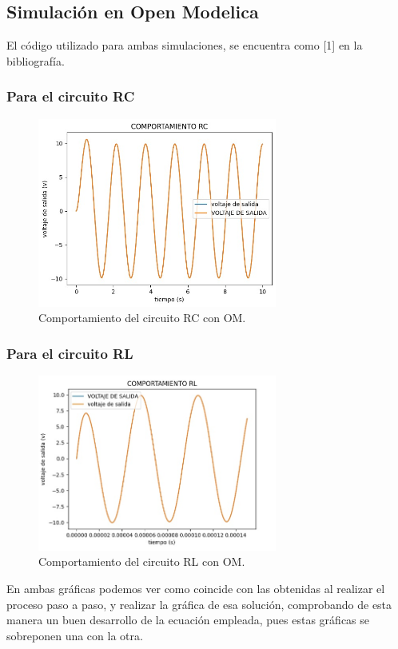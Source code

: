 \documentclass{article}
\begin{document}
\subsection{Simulación en Open Modelica}
El código utilizado para ambas simulaciones, se encuentra como [1] en la bibliografía.
\subsubsection{Para el circuito RC}
\begin{figure}[H]
    \centering
    \includegraphics[width=0.7\textwidth]{OMRC.jpg}
    \caption{Comportamiento del circuito RC con OM.}
    \label{fig:cOMRC}
\end{figure}
\subsubsection{Para el circuito RL}
\begin{figure}[H]
    \centering
    \includegraphics[width=0.7\textwidth]{OMRL.jpg}
    \caption{Comportamiento del circuito RL con OM.}
    \label{fig:cOMRL}
\end{figure}
En ambas gráficas podemos ver como coincide con las obtenidas al realizar el proceso paso a paso, y realizar la gráfica de esa solución, comprobando de esta manera un buen desarrollo de la ecuación empleada, pues estas gráficas se sobreponen una con la otra.
\end{document}

